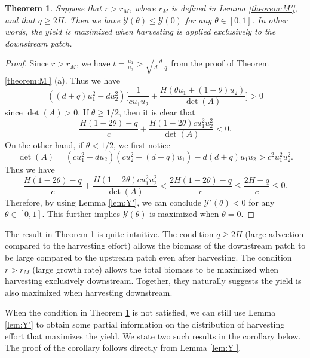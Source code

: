 \documentclass[11pt]{article}
\newtheorem{theorem}{Theorem}[section]
\def\YY{\mathcal{Y}}
\theoremstyle{definition}
\begin{document}
\begin{theorem}\label{thm:max_Y_downstream}
Suppose that $r>r_M$, where $r_M$ is defined in Lemma \ref{theorem:M'}, and that $q\geq 2H$. Then we have $\YY(\theta)\leq \YY(0)$ for any $\theta\in[0,1]$. In other words, the yield is maximized when harvesting is applied exclusively to the downstream patch.    
\end{theorem}
\begin{proof}
    Since $r>r_M$, we have $t=\frac{u_1}{u_2}>\sqrt{\frac{d}{d+q}}$ from the proof of Theorem \ref{theorem:M'} (a). Thus we have 
    \[
    ((d+q)u_1^2-du_2^2)\bigg[\frac{1}{cu_1u_2}+\frac{H(\theta u_1+(1-\theta)u_2)}{\det(A)}\bigg]>0
    \]
    since $\det(A)>0$. 
    If $\theta \geq 1/2$, then it is clear that 
    \[
    \frac{H(1-2\theta)-q}{c}+ \frac{H(1-2\theta)cu_1^2u_2^2}{\det(A)} <0.
    \]
    On the other hand, if $\theta <1/2$, we first notice
    \[\det(A)=(cu_1^2+du_2)(cu_2^2+(d+q)u_1)-d(d+q)u_1u_2>c^2u_1^2u_2^2.
    \]
    Thus we have
    \[
    \frac{H(1-2\theta)-q}{c}+ \frac{H(1-2\theta)cu_1^2u_2^2}{\det(A)} < \frac{2H(1-2\theta)-q}{c} \leq \frac{2H-q}{c}\leq 0.
    \]
    Therefore, by using Lemma \ref{lem:Y'}, we can conclude $\YY'(\theta) <0$ for any $\theta\in[0,1]$. This further implies $\YY(\theta)$ is maximized when $\theta=0$.
\end{proof}





The result in Theorem \ref{thm:max_Y_downstream} is quite intuitive. The condition $q\geq 2H$ (large advection compared to the harvesting effort) allows the biomass of the downstream patch to be large compared to the upstream patch even after harvesting. The condition $r>r_M$ (large growth rate) allows the total biomass to be maximized when harvesting exclusively downstream. Together, they naturally suggests the yield is also maximized when harvesting downstream.  

When the condition in Theorem \ref{thm:max_Y_downstream} is not satisfied, we can still use Lemma \ref{lem:Y'} to obtain some partial information on the distribution of harvesting effort that maximizes the yield. We state two such results in the corollary below. The proof of the corollary follows directly from Lemma \ref{lem:Y'}.
\end{document}
